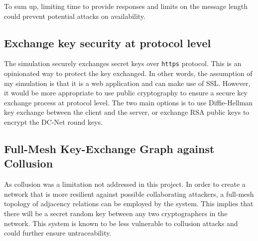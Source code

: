 To sum up, limiting time to provide responses and limits on the message length could prevent potential attacks on availability.


\subsection{Exchange key security at protocol level}
The simulation securely exchanges secret keys over \lstinline{https} protocol. This is an opinionated way to protect the key exchanged. In other words, the assumption of my simulation is that it is a web application and can make use of SSL. However, it would be more appropriate to use public cryptography to ensure a secure key exchange process at protocol level. The two main options is to use Diffie-Hellman key exchange between the client and the server, or exchange RSA public keys to encrypt the DC-Net round keys.

\subsection{Full-Mesh Key-Exchange Graph against Collusion}
As collusion was a limitation not addressed in this project. In order to create a network that is more resilient against possible collaborating attackers, a full-mesh topology of adjacency relations can be employed by the system. This implies that there will be a secret random key between any two cryptographers in the network. This system is known to be less vulnerable to collusion attacks and could further ensure untraceability.